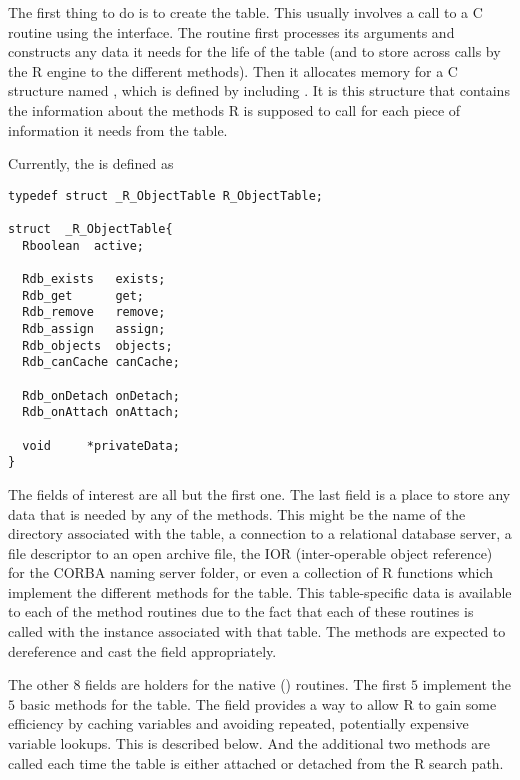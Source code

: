 \documentclass{article}
\begin{document}
The first thing to do is to create the table.  This usually involves a
call to a C routine using the  interface.  The
routine first processes its arguments and constructs any data it needs
for the life of the table (and to store across calls by the R engine
to the different methods).  Then it allocates memory for a C structure
named , which is defined by including
.  It is this structure that contains the
information about the methods R is supposed to call for each piece of
information it needs from the table.

Currently, the  is defined as
\begin{verbatim}
typedef struct _R_ObjectTable R_ObjectTable;

struct  _R_ObjectTable{
  Rboolean  active;

  Rdb_exists   exists;
  Rdb_get      get;
  Rdb_remove   remove;
  Rdb_assign   assign;
  Rdb_objects  objects;
  Rdb_canCache canCache;

  Rdb_onDetach onDetach;
  Rdb_onAttach onAttach;
  
  void     *privateData;
}
\end{verbatim}
The fields of interest are all but the first one.  The last field is a
place to store any data that is needed by any of the methods.  This
might be the name of the directory associated with the table, a
connection to a relational database server, a file descriptor to an
open archive file, the IOR (inter-operable object reference) for the
CORBA naming server folder, or even a collection of R functions
which implement the different methods for the table. 
This table-specific data is available to each of the method
routines due to the fact that each of these routines
is called with the  instance
associated with that table. The methods are expected to
dereference and cast the  field
appropriately.


The other $8$ fields are holders for the native (\C) routines.  The
first $5$ implement the $5$ basic methods for the table.  The
 field provides a way to allow R to gain some
efficiency by caching variables and avoiding repeated, potentially
expensive variable lookups. This is described below.  And the
additional two methods are called each time the table is either
attached or detached from the R search path.
\end{document}
